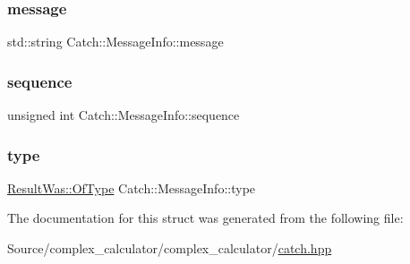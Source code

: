 \subsubsection{\texorpdfstring{message}{message}}
{\footnotesize\ttfamily std\+::string Catch\+::\+Message\+Info\+::message}

\mbox{\label{struct_catch_1_1_message_info_a7f4f57ea21e50160adefce7b68a781d6}} 
\subsubsection{\texorpdfstring{sequence}{sequence}}
{\footnotesize\ttfamily unsigned int Catch\+::\+Message\+Info\+::sequence}

\mbox{\label{struct_catch_1_1_message_info_ae928b9117465c696e45951d9d0284e78}} 
\subsubsection{\texorpdfstring{type}{type}}
{\footnotesize\ttfamily \mbox{\hyperlink{struct_catch_1_1_result_was_a624e1ee3661fcf6094ceef1f654601ef}{Result\+Was\+::\+Of\+Type}} Catch\+::\+Message\+Info\+::type}



The documentation for this struct was generated from the following file\+:\begin{DoxyCompactItemize}
\item 
Source/complex\+\_\+calculator/complex\+\_\+calculator/\mbox{\hyperlink{catch_8hpp}{catch.\+hpp}}\end{DoxyCompactItemize}
